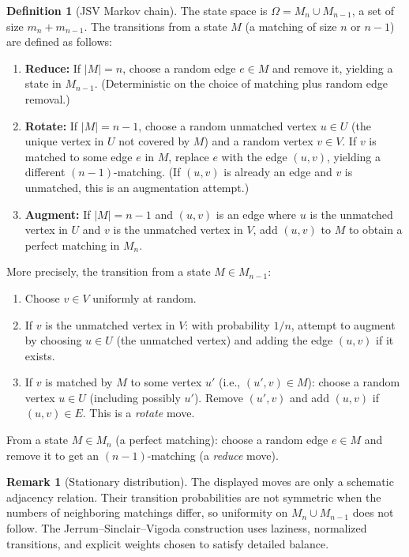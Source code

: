 \documentclass[twoside,12pt]{book}
\theoremstyle{plain}
\theoremstyle{definition}
\newtheorem{definition}[theorem]{Definition}
\newtheorem{remark}[theorem]{Remark}
\theoremstyle{remark}
\begin{document}
\begin{definition}[JSV Markov chain]
\label{def:jsv-chain}
The state space is $\Omega = M_n \cup M_{n-1}$, a set of size $m_n + m_{n-1}$. The transitions from a state $M$ (a matching of size $n$ or $n-1$) are defined as follows:
\begin{enumerate}[nosep]
    \item \textbf{Reduce:} If $|M| = n$, choose a random edge $e \in M$ and remove it, yielding a state in $M_{n-1}$. (Deterministic on the choice of matching plus random edge removal.)
    \item \textbf{Rotate:} If $|M| = n-1$, choose a random unmatched vertex $u \in U$ (the unique vertex in $U$ not covered by $M$) and a random vertex $v \in V$. If $v$ is matched to some edge $e$ in $M$, replace $e$ with the edge $(u, v)$, yielding a different $(n-1)$-matching. (If $(u, v)$ is already an edge and $v$ is unmatched, this is an augmentation attempt.)
    \item \textbf{Augment:} If $|M| = n-1$ and $(u, v)$ is an edge where $u$ is the unmatched vertex in $U$ and $v$ is the unmatched vertex in $V$, add $(u, v)$ to $M$ to obtain a perfect matching in $M_n$.
\end{enumerate}
\end{definition}

More precisely, the transition from a state $M \in M_{n-1}$:
\begin{enumerate}[nosep]
    \item Choose $v \in V$ uniformly at random.
    \item If $v$ is the unmatched vertex in $V$: with probability $1/n$, attempt to augment by choosing $u \in U$ (the unmatched vertex) and adding the edge $(u, v)$ if it exists.
    \item If $v$ is matched by $M$ to some vertex $u'$ (i.e., $(u', v) \in M$): choose a random vertex $u \in U$ (including possibly $u'$). Remove $(u', v)$ and add $(u, v)$ if $(u, v) \in E$. This is a \emph{rotate} move.
\end{enumerate}

From a state $M \in M_n$ (a perfect matching): choose a random edge $e \in M$ and remove it to get an $(n-1)$-matching (a \emph{reduce} move).

\begin{remark}[Stationary distribution]
The displayed moves are only a schematic adjacency relation. Their transition
probabilities are not symmetric when the numbers of neighboring matchings
differ, so uniformity on $M_n\cup M_{n-1}$ does not follow. The
Jerrum--Sinclair--Vigoda construction uses laziness, normalized transitions,
and explicit weights chosen to satisfy detailed balance.
\end{remark}
\end{document}
